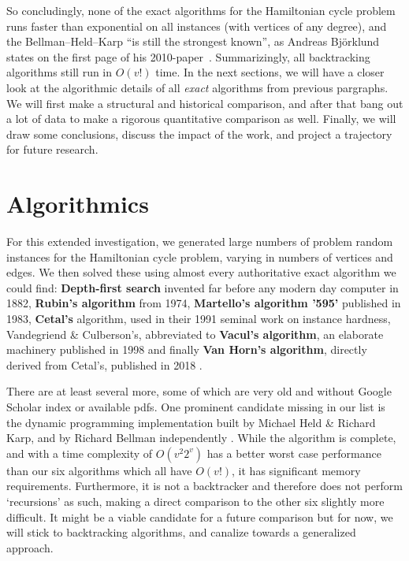 \documentclass[10pt,conference,compsocconf]{IEEEtran}
\begin{document}
So concludingly, none of the exact algorithms for the Hamiltonian cycle problem runs faster than exponential on all instances (with vertices of any degree), and the Bellman--Held--Karp ``is still the strongest known'', as Andreas Bj\"orklund states on the first page of his 2010-paper~\cite{bjorklund2014determinant}. Summarizingly, all backtracking algorithms still run in $O(v!)$ time. In the next sections, we will have a closer look at the algorithmic details of all \textit{exact} algorithms from previous pargraphs. We will first make a structural and historical comparison, and after that bang out a lot of data to make a rigorous quantitative comparison as well. Finally, we will draw some conclusions, discuss the impact of the work, and project a trajectory for future research.


\section{Algorithmics}
\noindent For this extended investigation, we generated large numbers of problem random instances for the Hamiltonian cycle problem, varying in numbers of vertices and edges. We then solved these using almost every authoritative exact algorithm we could find: \textbf{Depth-first search} invented far before any modern day computer in 1882, \textbf{Rubin's algorithm} from 1974, \textbf{Martello's algorithm '595'} published in 1983, \textbf{Cetal's} algorithm,  used in their 1991 seminal work on instance hardness, Vandegriend \& Culberson's, abbreviated to \textbf{Vacul's algorithm}, an elaborate machinery published in 1998 and finally \textbf{Van Horn's algorithm}, directly derived from Cetal's, published in 2018 \cite{even1979graph}\cite{rubin1974search}\cite{martello1983algorithm}\cite{cheeseman1991really}\cite{vandegriend1998gn}\cite{van2018predictive}.

There are at least several more, some of which are very old and without Google Scholar index or available pdfs. One prominent candidate missing in our list is the dynamic programming implementation built by Michael Held \& Richard Karp, and by Richard Bellman independently \cite{held1962dynamic}\cite{bellman1962dynamic}. While the algorithm is complete, and with a time complexity of $O(v^2 2^v)$ has a better worst case performance than our six algorithms which all have $O(v!)$, it has significant memory requirements. Furthermore, it is not a backtracker and therefore does not perform `recursions' as such, making a direct comparison to the other six slightly more difficult. It might be a viable candidate for a future comparison but for now, we will stick to backtracking algorithms, and canalize towards a generalized approach.
\end{document}
